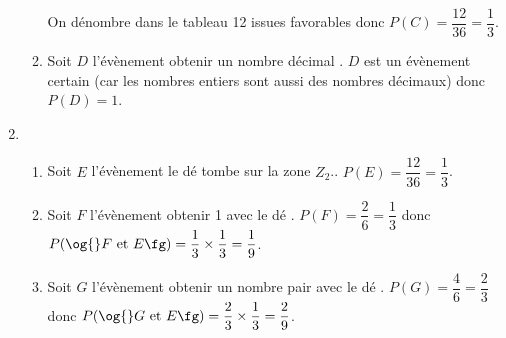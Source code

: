 \begin{enumerate}
\begin{enumerate}
	\medskip On dénombre dans le tableau 12 issues favorables donc $P(C)=\dfrac{12}{36}=\dfrac{1}{3}$.
	
	\item Soit $D$ l'évènement \og{} obtenir un nombre décimal \fg{}. $D$ est un évènement certain (car les nombres entiers sont aussi des nombres décimaux) donc $P(D)=1$.
	\end{enumerate}
	
	\item 
	\begin{enumerate}
		\item Soit $E$ l'évènement \og{} le dé tombe sur la zone $Z_2$.\fg{}. $P(E)=\dfrac{12}{36}=\dfrac{1}{3}$.
		
		\item Soit $F$ l'évènement \og{} obtenir 1 avec le dé \fg{}. $P(F)=\dfrac{2}{6}=\dfrac{1}{3}$ donc $P(\text{\og{}} F~\text{et }E\text{\fg})=\dfrac{1}{3}\times\dfrac{1}{3}=\dfrac{1}{9}$.
		
		\item Soit $G$ l'évènement \og{} obtenir un nombre pair avec le dé \fg{}. $P(G)=\dfrac{4}{6}=\dfrac{2}{3}$ donc $P(\text{\og{}} G~\text{et }E\text{\fg})=\dfrac{2}{3}\times\dfrac{1}{3}=\dfrac{2}{9}$.
		
		 
	\end{enumerate}

\end{enumerate}